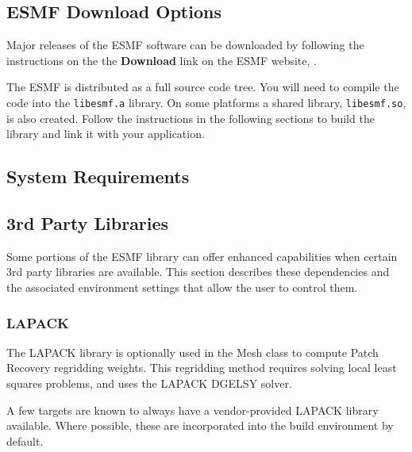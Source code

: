 
\subsection{ESMF Download Options}

Major releases of the ESMF software can be downloaded by following
the instructions on the the {\bf Download} link on the ESMF 
website, .

The ESMF is distributed as a full source code tree.  You will need
to compile the code into the {\tt libesmf.a} library.
On some platforms a shared library, {\tt libesmf.so}, is also created.
Follow the instructions in the following sections
to build the library and link it with your application.


\subsection{System Requirements}
\label{sec:systemreq}


\subsection{3rd Party Libraries}
\label{sec:3rdParty}

Some portions of the ESMF library can offer enhanced capabilities when
certain 3rd party libraries are available. This section describes
these dependencies and the associated environment settings
that allow the user to control them.


\subsubsection{LAPACK}
The LAPACK library is optionally used in the Mesh class to
compute Patch Recovery regridding weights.  This regridding method requires
solving local least squares problems, and uses the LAPACK DGELSY solver.

A few targets are known to always have a vendor-provided LAPACK
library available.  Where possible, these are incorporated into
the build environment by default.  

